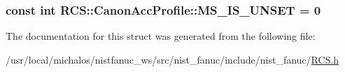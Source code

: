 \hypertarget{structRCS_1_1CanonAccProfile_a4c8249dfd6aaf09367d2abf3a2c6f54e}{
\subsubsection[{M\-S\-\_\-\-I\-S\-\_\-\-U\-N\-S\-E\-T}]{\setlength{\rightskip}{0pt plus 5cm}const int R\-C\-S\-::\-Canon\-Acc\-Profile\-::\-M\-S\-\_\-\-I\-S\-\_\-\-U\-N\-S\-E\-T = 0\hspace{0.3cm}{\ttfamily [static]}}}\label{structRCS_1_1CanonAccProfile_a4c8249dfd6aaf09367d2abf3a2c6f54e}


The documentation for this struct was generated from the following file\-:\begin{DoxyCompactItemize}
\item 
/usr/local/michalos/nistfanuc\-\_\-ws/src/nist\-\_\-fanuc/include/nist\-\_\-fanuc/\hyperlink{RCS_8h}{R\-C\-S.\-h}\end{DoxyCompactItemize}
